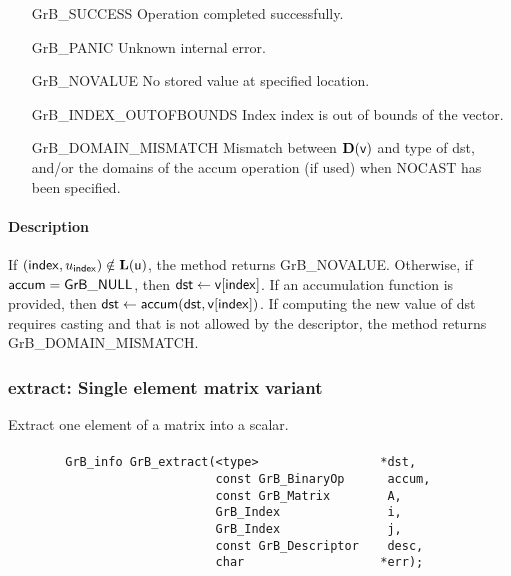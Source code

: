 \begin{itemize}[leftmargin=2.1in]
\item[{\sf GrB\_SUCCESS}]          Operation completed successfully.
\item[{\sf GrB\_PANIC}]            Unknown internal error.
\item[{\sf GrB\_NOVALUE}]        No stored value at specified location.
\item[{\sf GrB\_INDEX\_OUTOFBOUNDS}]  Index {\sf index} is out of 
                                      bounds of the vector. 
\item[{\sf GrB\_DOMAIN\_MISMATCH}]    Mismatch between $\bold{D}(\sf v)$ and type of {\sf dst},
                                      and/or the domains of the 
                                      {\sf accum} operation (if used) when {\sf NOCAST} has
                                      been specified.
\end{itemize}

\paragraph{Description}

If $({\sf index},u_{\sf index}) \notin \bold{L}({\sf u})$, the method returns {\sf GrB\_NOVALUE}.
Otherwise, if ${\sf accum} = {\sf GrB\_NULL}$, then ${\sf dst} \leftarrow {\sf v}[{\sf index}]$.
If an accumulation function is provided, then ${\sf dst} \leftarrow {\sf accum}({\sf dst},{\sf v}[{\sf index}])$.
If computing the new value of {\sf dst} requires casting and that is not allowed by the descriptor,
the method returns {\sf GrB\_DOMAIN\_MISMATCH}.


\subsubsection{{\sf extract}: Single element matrix variant}
\label{Sec:extract_single_element_mat}

Extract one element of a matrix into a scalar. 

\paragraph{\syntax}

\begin{verbatim}
        GrB_info GrB_extract(<type>                 *dst,
                             const GrB_BinaryOp      accum,
                             const GrB_Matrix        A,
                             GrB_Index               i,
                             GrB_Index               j,
                             const GrB_Descriptor    desc,
                             char                   *err); 

\end{verbatim}

